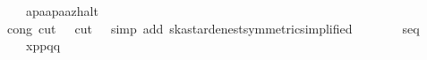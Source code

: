 \begin{isabellebody}
\ \ \ \ {}a{}{}p{}{}{}a{}{}{}{}a{}{}p{}{}{}a{}{}a{}{}z{}{}halt{}{}\isanewline
\ \ \ \ \isamarkupfalse%
\ {}cong{}\ cut\ {}\ {}{}\ cut\ {}\ {}{}\ simp\ add{}\ ska{}star{}denest{}symmetric{}simplified{}{}\isanewline
\isanewline
\ \ \isamarkupfalse%
\ \isamarkupfalse%
\ {}{}{}{}\ {}\ seq\isanewline
\ \ \ \ {}x{}{}p{}{}{}p{}{}{}q{}{}{}{}q{}{}{}\isanewline

\end{isabellebody}
